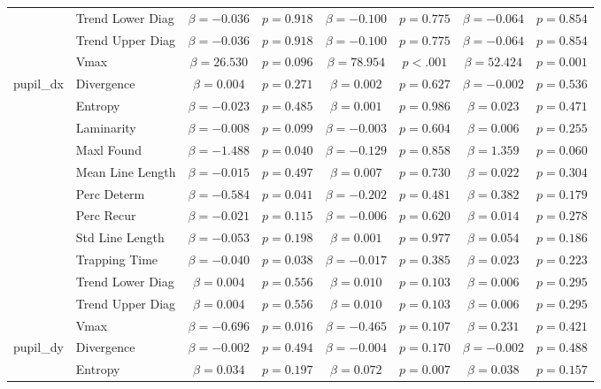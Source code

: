 \begin{tabular}{llcc|cc|cc}
 & Trend Lower Diag & $\beta = -0.036$ & $p = 0.918$ & $\beta = -0.100$ & $p = 0.775$ & $\beta = -0.064$ & $p = 0.854$ \\
 & Trend Upper Diag & $\beta = -0.036$ & $p = 0.918$ & $\beta = -0.100$ & $p = 0.775$ & $\beta = -0.064$ & $p = 0.854$ \\
 & Vmax & $\beta = 26.530$ & $p = 0.096$ & $\beta = 78.954$ & $p < .001$ & $\beta = 52.424$ & $p = 0.001$ \\
\midrule
\multirow{12}{*}{pupil_dx} & Divergence & $\beta = 0.004$ & $p = 0.271$ & $\beta = 0.002$ & $p = 0.627$ & $\beta = -0.002$ & $p = 0.536$ \\
 & Entropy & $\beta = -0.023$ & $p = 0.485$ & $\beta = 0.001$ & $p = 0.986$ & $\beta = 0.023$ & $p = 0.471$ \\
 & Laminarity & $\beta = -0.008$ & $p = 0.099$ & $\beta = -0.003$ & $p = 0.604$ & $\beta = 0.006$ & $p = 0.255$ \\
 & Maxl Found & $\beta = -1.488$ & $p = 0.040$ & $\beta = -0.129$ & $p = 0.858$ & $\beta = 1.359$ & $p = 0.060$ \\
 & Mean Line Length & $\beta = -0.015$ & $p = 0.497$ & $\beta = 0.007$ & $p = 0.730$ & $\beta = 0.022$ & $p = 0.304$ \\
 & Perc Determ & $\beta = -0.584$ & $p = 0.041$ & $\beta = -0.202$ & $p = 0.481$ & $\beta = 0.382$ & $p = 0.179$ \\
 & Perc Recur & $\beta = -0.021$ & $p = 0.115$ & $\beta = -0.006$ & $p = 0.620$ & $\beta = 0.014$ & $p = 0.278$ \\
 & Std Line Length & $\beta = -0.053$ & $p = 0.198$ & $\beta = 0.001$ & $p = 0.977$ & $\beta = 0.054$ & $p = 0.186$ \\
 & Trapping Time & $\beta = -0.040$ & $p = 0.038$ & $\beta = -0.017$ & $p = 0.385$ & $\beta = 0.023$ & $p = 0.223$ \\
 & Trend Lower Diag & $\beta = 0.004$ & $p = 0.556$ & $\beta = 0.010$ & $p = 0.103$ & $\beta = 0.006$ & $p = 0.295$ \\
 & Trend Upper Diag & $\beta = 0.004$ & $p = 0.556$ & $\beta = 0.010$ & $p = 0.103$ & $\beta = 0.006$ & $p = 0.295$ \\
 & Vmax & $\beta = -0.696$ & $p = 0.016$ & $\beta = -0.465$ & $p = 0.107$ & $\beta = 0.231$ & $p = 0.421$ \\
\midrule
\multirow{12}{*}{pupil_dy} & Divergence & $\beta = -0.002$ & $p = 0.494$ & $\beta = -0.004$ & $p = 0.170$ & $\beta = -0.002$ & $p = 0.488$ \\
 & Entropy & $\beta = 0.034$ & $p = 0.197$ & $\beta = 0.072$ & $p = 0.007$ & $\beta = 0.038$ & $p = 0.157$ \\

\end{tabular}

